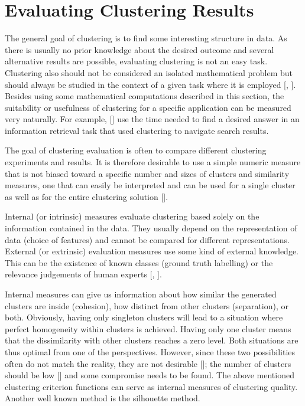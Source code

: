 \section{Evaluating Clustering Results}
The general goal of clustering is to find some interesting structure in data. As there is usually no prior knowledge about the desired outcome and several alternative results are possible, evaluating clustering is not an easy task. Clustering also should not be considered an isolated mathematical problem but should always be studied in the context of a given task where it is employed [\cite{ref268}, \cite{ref115}]. Besides using some mathematical computations described in this section, the suitability or usefulness of clustering for a specific application can be measured very naturally. For example, [\cite{ref185}] use the time needed to find a desired answer in an information retrieval task that used clustering to navigate search results.

The goal of clustering evaluation is often to compare different clustering experiments and results. It is therefore desirable to use a simple numeric measure that is not biased toward a specific number and sizes of clusters and similarity measures, one that can easily be interpreted and can be used for a single cluster as well as for the entire clustering solution [\cite{ref244}].

Internal (or intrinsic) measures evaluate clustering based solely on the information contained in the data. They usually depend on the representation of data (choice of features) and cannot be compared for different representations. External (or extrinsic) evaluation measures use some kind of external knowledge. This can be the existence of known classes (ground truth labelling) or the relevance judgements of human experts [\cite{ref68}, \cite{ref127}].

Internal measures can give us information about how similar the generated clusters are inside (cohesion), how distinct from other clusters (separation), or both. Obviously, having only singleton clusters will lead to a situation where perfect homogeneity within clusters is achieved. Having only one cluster means that the dissimilarity with other clusters reaches a zero level. Both situations are thus optimal from one of the perspectives. However, since these two possibilities often do not match the reality, they are not desirable [\cite{ref244}]; the number of clusters should be low [\cite{ref115}] and some compromise needs to be found. The above mentioned clustering criterion functions can serve as internal measures of clustering quality. Another well known method is the silhouette method.

